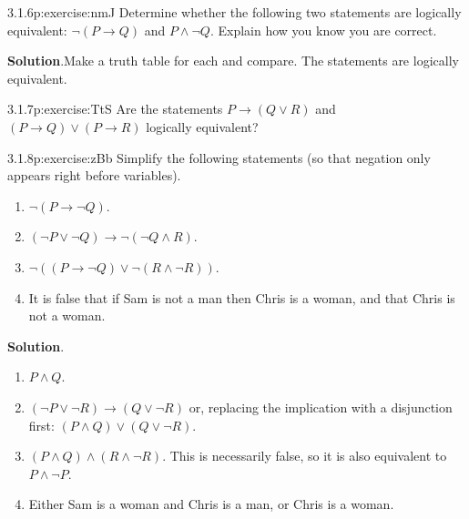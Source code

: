 \documentclass[twoside,11pt,]{book}
\newcommand{\blocktitlefont}{\relax}
\numberwithin{equation}{chapter}
\newcommand{\imp}{\rightarrow}
\begin{document}
\begin{divisionsolution}{3.1.6}{}{p:exercise:nmJ}%
Determine whether the following two statements are logically equivalent: \(\neg(P \imp Q)\) and \(P \wedge \neg Q\). Explain how you know you are correct.%
\par\smallskip%
\noindent\textbf{\blocktitlefont Solution}.\quad{}Make a truth table for each and compare. The statements are logically equivalent.%
\end{divisionsolution}%
\begin{divisionsolution}{3.1.7}{}{p:exercise:TtS}%
Are the statements \(P \imp (Q\vee R)\) and \((P \imp Q) \vee (P \imp R)\) logically equivalent?%
\end{divisionsolution}%
\begin{divisionsolution}{3.1.8}{}{p:exercise:zBb}%
Simplify the following statements (so that negation only appears right before variables).%
\begin{enumerate}[label=(\alph*)]
\item{}\(\neg(P \imp \neg Q)\).%
\item{}\((\neg P \vee \neg Q) \imp \neg (\neg Q \wedge R)\).%
\item{}\(\neg((P \imp \neg Q) \vee \neg (R \wedge \neg R))\).%
\item{}It is false that if Sam is not a man then Chris is a woman, and that Chris is not a woman.%
\end{enumerate}
%
\par\smallskip%
\noindent\textbf{\blocktitlefont Solution}.\quad{}%
\begin{enumerate}[label=(\alph*)]
\item{}\(P \wedge Q\).%
\item{}\((\neg P \vee \neg R) \imp (Q \vee \neg R)\) or, replacing the implication with a disjunction first: \((P \wedge Q) \vee (Q \vee \neg R)\).%
\item{}\((P \wedge Q) \wedge (R \wedge \neg R)\). This is necessarily false, so it is also equivalent to \(P \wedge \neg P\).%
\item{}Either Sam is a woman and Chris is a man, or Chris is a woman.%
\end{enumerate}
%
\end{divisionsolution}%
\end{document}
